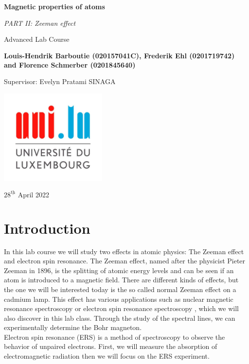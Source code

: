 \documentclass{scrartcl}
\begin{document}
\begin{titlepage}
    \begin{center}
        \vspace*{1cm}
        \Huge
        \textbf{Magnetic properties of atoms}
        
        \vspace{0.5cm}
        \LARGE
        \textit{PART II: Zeeman effect}
        
        \vspace{0.5cm}
        \LARGE
        Advanced Lab Course
        
        \vspace{1.5cm}
        \textbf{Louis-Hendrik Barboutie (020157041C), Frederik Ehl (0201719742) and Florence Schmerber (0201845640)}
        
        \vspace{1cm}
        Supervisor: Evelyn Pratami SINAGA
        \vfill
        

        \includegraphics[width=0.4\textwidth]{logo_uni.jpg}
        
        \Large
        $28^{\underline{\text{th}}}$ April 2022
    \end{center}
\end{titlepage}

\section{Introduction}

In this lab course we will study two effects in atomic physics: The Zeeman effect and electron spin resonance. The Zeeman effect, named after the physicist Pieter Zeeman in 1896,  is the splitting of atomic energy levels and can be seen if an atom is introduced to a magnetic field. There are different kinds of effects, but the one we will be interested today is the so called normal Zeeman effect on a cadmium lamp. This effect has various applications such as nuclear magnetic resonance spectroscopy or electron spin resonance spectroscopy \cite{Zeeman}, which we will also discover in this lab class. Through the study of the spectral lines, we can experimentally determine the Bohr magneton.\\
Electron spin resonance (ERS) is a method of spectroscopy to observe the behavior of unpaired electrons. First, we will measure the absorption of electromagnetic radiation then we will focus on the ERS experiment.
\end{document}

